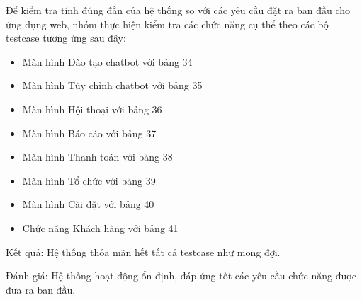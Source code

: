 Để kiểm tra tính đúng đắn của hệ thống so với các yêu cầu đặt ra ban đầu cho ứng dụng web, nhóm
thực hiện kiểm tra các chức năng cụ thể theo các bộ testcase tương ứng sau đây:
\begin{itemize}
    \item Màn hình Đào tạo chatbot với bảng 34
    
    \item Màn hình Tùy chỉnh chatbot với bảng 35
    
    \item Màn hình Hội thoại với bảng 36
    
    \item Màn hình Báo cáo với bảng 37
    
    \item Màn hình Thanh toán với bảng 38
    
    \item Màn hình Tổ chức với bảng 39
    
    \item Màn hình Cài đặt với bảng 40
    
    \item Chức năng Khách hàng với bảng 41
    
\end{itemize}
 
Kết quả: Hệ thống thỏa mãn hết tất cả testcase như mong đợi.

Đánh giá: Hệ thống hoạt động ổn định, đáp ứng tốt các yêu cầu chức năng được đưa ra ban đầu.